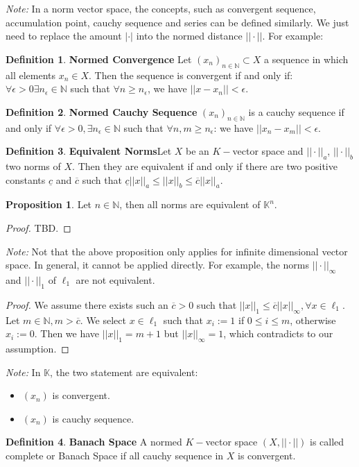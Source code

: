 \documentclass{article}
\theoremstyle{definition}
\newtheorem{defi}{Definition}[subsection]
\newtheorem{prop}{Proposition}[subsection]
\begin{document}
\textit{Note:} In a norm vector space, the concepts, such as convergent sequence, accumulation point, cauchy sequence and series can be defined similarly. We just need to replace the amount $|\cdot|$ into the normed distance $||\cdot||$. For example: 
\begin{defi}
\textbf{Normed Convergence} Let $(x_n)_{n\in\mathbb{N}}\subset X$ a sequence in which all elements $x_n\in X$. Then the sequence is convergent if and only if: $\forall\epsilon >0 \exists n_\epsilon\in\mathbb{N}$ such that $\forall n\geq n_\epsilon$, we have $||x-x_n||< \epsilon$.
\end{defi}
\begin{defi}
\textbf{Normed Cauchy Sequence} $(x_n)_{n\in\mathbb{N}}$ is a cauchy sequence if and only if $\forall \epsilon>0, \exists n_\epsilon\in\mathbb{N}$ such that $\forall n, m\geq n_\epsilon$: we have $||x_n-x_m||<\epsilon$.

\end{defi}
\begin{defi}
\textbf{Equivalent Norms}Let $X$ be an $K-$vector space and $||\cdot||_a$, $||\cdot||_b$ two norms of $X$. Then they are equivalent if and only if there are two positive constants $\underline{c}$ and $\overline{c}$ such that $\underline{c}||x||_a \leq ||x||_b \leq \overline{c}||x||_a$.
\end{defi}

\begin{prop}
Let $n\in\mathbb{N}$, then all norms are equivalent of $\mathbb{K}^n$.
\begin{proof}
TBD.
\end{proof}
\end{prop}
\textit{Note:} Not that the above proposition only applies for infinite dimensional vector space. In general, it cannot be applied directly. For example, the norms $||\cdot||_{\infty
}$ and $||\cdot||_1$ of $\ell_1$ are not equivalent.
\begin{proof}
We assume there exists such an $\overline{c}>0$ such that $||x||_1 \leq \overline{c}||x||_{\infty}, \forall x\in\ell_{1}$.
Let $m\in\mathbb{N}, m>\overline{c}$. We select $x\in\ell_{1}$ such that $x_i := 1$ if $0\leq i\leq m$, otherwise $x_i := 0$. Then we have $||x||_1=m+1$ but $||x||_\infty=1$, which contradicts to our assumption.
\end{proof}
\textit{Note:} In $\mathbb{K}$, the two statement are equivalent:
\begin{itemize}
    \item $(x_n)$ is convergent.
    \item $(x_n)$ is cauchy sequence.
\end{itemize}
\begin{defi}
\textbf{Banach Space} A normed $K-$vector space $(X, ||\cdot||)$ is called complete or Banach Space if all cauchy sequence in $X$ is convergent.
\end{defi}
\end{document}
